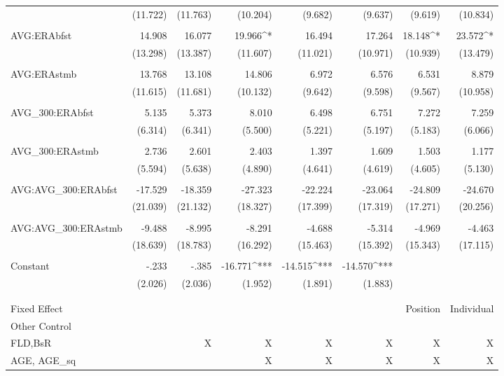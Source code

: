 \begin{table}[H]
\begin{tabular}{@{\extracolsep{5pt}}lD{.}{.}{-3} D{.}{.}{-3} D{.}{.}{-3} D{.}{.}{-3} D{.}{.}{-3} D{.}{.}{-3} D{.}{.}{-3} }
  & (11.722) & (11.763) & (10.204) & (9.682) & (9.637) & (9.619) & (10.834) \\
  & & & & & & & \\
 AVG:ERAbfst & 14.908 & 16.077 & 19.966^{*} & 16.494 & 17.264 & 18.148^{*} & 23.572^{*} \\
  & (13.298) & (13.387) & (11.607) & (11.021) & (10.971) & (10.939) & (13.479) \\
  & & & & & & & \\
 AVG:ERAstmb & 13.768 & 13.108 & 14.806 & 6.972 & 6.576 & 6.531 & 8.879 \\
  & (11.615) & (11.681) & (10.132) & (9.642) & (9.598) & (9.567) & (10.958) \\
  & & & & & & & \\
 AVG\_300:ERAbfst & 5.135 & 5.373 & 8.010 & 6.498 & 6.751 & 7.272 & 7.259 \\
  & (6.314) & (6.341) & (5.500) & (5.221) & (5.197) & (5.183) & (6.066) \\
  & & & & & & & \\
 AVG\_300:ERAstmb & 2.736 & 2.601 & 2.403 & 1.397 & 1.609 & 1.503 & 1.177 \\
  & (5.594) & (5.638) & (4.890) & (4.641) & (4.619) & (4.605) & (5.130) \\
  & & & & & & & \\
 AVG:AVG\_300:ERAbfst & -17.529 & -18.359 & -27.323 & -22.224 & -23.064 & -24.809 & -24.670 \\
  & (21.039) & (21.132) & (18.327) & (17.399) & (17.319) & (17.271) & (20.256) \\
  & & & & & & & \\
 AVG:AVG\_300:ERAstmb & -9.488 & -8.995 & -8.291 & -4.688 & -5.314 & -4.969 & -4.463 \\
  & (18.639) & (18.783) & (16.292) & (15.463) & (15.392) & (15.343) & (17.115) \\
  & & & & & & & \\
 Constant & -.233 & -.385 & -16.771^{***} & -14.515^{***} & -14.570^{***} &  &  \\
  & (2.026) & (2.036) & (1.952) & (1.891) & (1.883) &  &  \\
  & & & & & & & \\
\hline \\[-1.8ex]
Fixed Effect & & & & & & Position & Individual \\ \hline
Other Control \\
FLD,BsR & & X & X & X & X & X & X\\
AGE, AGE_sq & & & X & X & X & X & X\\

\end{tabular}
\end{table}
